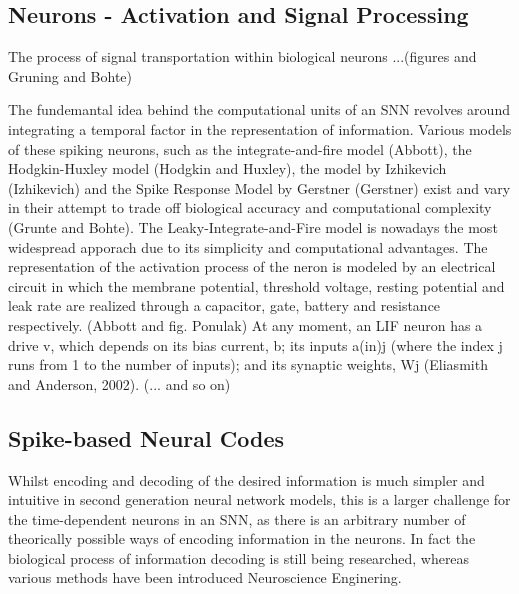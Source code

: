 \documentclass[letterpaper, 10 pt, conference]{ieeeconf}  %
\begin{document}
\subsection{Neurons - Activation and Signal Processing} 

The process of signal transportation within biological neurons ...(figures and Gruning and Bohte)\newline

The fundemantal idea behind the computational units of an SNN revolves around integrating a temporal factor 
in the representation of information. Various models of these spiking neurons, such as the integrate-and-fire model (Abbott), 
the Hodgkin-Huxley model (Hodgkin and Huxley), the model by Izhikevich (Izhikevich) and the Spike Response Model by Gerstner (Gerstner) 
exist and vary in their attempt to trade off biological accuracy and computational complexity (Grunte and Bohte).
The Leaky-Integrate-and-Fire model is nowadays the most widespread apporach due to its simplicity and computational advantages. 
The representation of the activation process of the neron is modeled by an electrical circuit in which the membrane potential, threshold voltage,
resting potential and leak rate are realized through a capacitor, gate, battery and resistance respectively. (Abbott and fig. Ponulak)
\newline
At any moment, an LIF neuron has a drive v, which depends on its bias
current, b; its inputs a(in)j (where the index j runs from 1 to the number
of inputs); and its synaptic weights, Wj (Eliasmith and Anderson, 2002). (... and so on)

\subsection{Spike-based Neural Codes}

Whilst encoding and decoding of the desired information is much simpler and intuitive in second generation neural network models,
this is a larger challenge for the time-dependent neurons in an SNN, as there is an arbitrary 
number of theorically possible ways of encoding information in the neurons. In fact the biological process of information decoding is 
still being researched, whereas various methods have been introduced Neuroscience Enginering.
\end{document}
